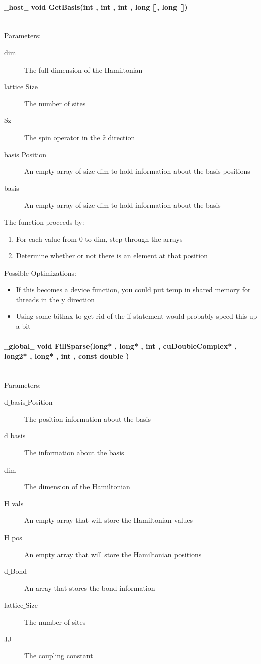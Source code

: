 \documentclass{article}
\begin{document}
\paragraph{$\_\_$host$\_\_$ void GetBasis(int , int , int , long [], long [])}
\\
Parameters:
\begin{description}
\item[dim] The full dimension of the Hamiltonian
\item[lattice$\_$Size] The number of sites
\item[Sz] The spin operator in the $\hat{z}$ direction
\item[basis$\_$Position] An empty array of size dim to hold information about the basis positions
\item[basis] An empty array of size dim to hold information about the basis
\end{description}

The function proceeds by:
\begin{enumerate}
\item{For each value from 0 to dim, step through the arrays}
\item{Determine whether or not there is an element at that position}
\end{enumerate}

Possible Optimizations:
\begin{itemize}
\item{If this becomes a device function, you could put temp in shared memory for threads in the y direction}
\item{Using some bithax to get rid of the if statement would probably speed this up a bit}
\end{itemize}

\paragraph{$\_\_$global$\_\_$ void FillSparse(long* , long* , int , cuDoubleComplex* , long2* , long* , int , const double )}
\\
Parameters:
\begin{description}
\item[d$\_$basis$\_$Position] The position information about the basis
\item[d$\_$basis] The information about the basis
\item[dim] The dimension of the Hamiltonian
\item[H$\_$vals] An empty array that will store the Hamiltonian values
\item[H$\_$pos] An empty array that will store the Hamiltonian positions
\item[d$\_$Bond] An array that stores the bond information
\item[lattice$\_$Size] The number of sites
\item[JJ] The coupling constant
\end{description}
\end{document}
